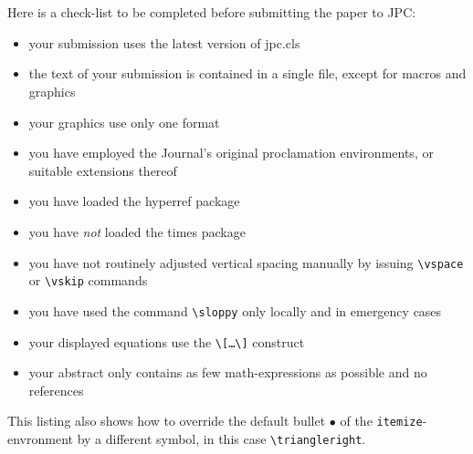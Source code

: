 \documentclass{jpc} %
\theoremstyle{plain}\newtheorem{satz}[thm]{Satz} %
\begin{document}
\section{}
  Here is a check-list to be completed before submitting the paper to
  JPC:
\begin{itemize}[label=$\triangleright$]
\item your submission uses the latest version of jpc.cls
\item the text of your submission is contained in a single file,
  except for macros and graphics
\item your graphics use only one format 
\item you have employed the Journal's original proclamation environments,
  or suitable extensions thereof 
\item you have loaded the hyperref package
\item you have \emph{not} loaded the times package
\item you have not routinely adjusted vertical spacing manually by issuing
  \texttt{\textbackslash vspace} or \texttt{\textbackslash vskip} commands
\item you have used the command \texttt{\textbackslash sloppy} only
  locally and in emergency cases
\item your displayed equations use the
  \texttt{\textbackslash[\dots\textbackslash]} construct
\item your abstract only contains as few math-expressions as possible and no
  references 
\end{itemize}

  This listing also shows how to override the default bullet $\bullet$
  of the \texttt{itemize}-envronment by a different symbol, in this
  case \texttt{\textbackslash triangleright}.
\end{document}

